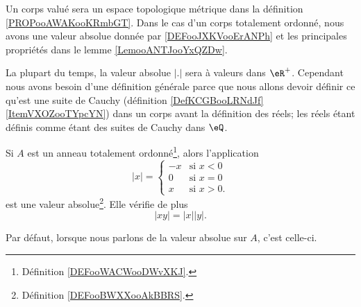 \begin{normaltext}\label{NORooLienCorpsValueEspaceMetrique}
	Un corps valué sera un espace topologique métrique dans la définition \ref{PROPooAWAKooKRmbGT}. Dans le cas d'un corps totalement ordonné, nous avons une valeur absolue donnée par \ref{DEFooJXKVooErANPh} et les principales propriétés dans le lemme \ref{LemooANTJooYxQZDw}.
\end{normaltext}

\begin{normaltext}\label{NORooValAbsGenerale}
	La plupart du temps, la valeur absolue \( | . |\) sera à valeurs dans \( \eR^+\). Cependant nous avons besoin d'une définition générale parce que nous allons devoir définir ce qu'est une suite de Cauchy (définition \ref{DefKCGBooLRNdJf}\ref{ItemVXOZooTYpcYN}) dans un corps avant la définition des réels; les réels étant définis comme étant des suites de Cauchy dans \( \eQ\).
\end{normaltext}


\begin{propositionDef}	\label{DEFooJXKVooErANPh}
	Si \( A\) est un anneau totalement ordonné\footnote{Définition \ref{DEFooWACWooDWvXKJ}.}, alors l'application
	\begin{equation}      \label{EQooNONAooHLSERO}
		| x |=\begin{cases}
			-x & \text{si }x< 0  \\
			0  & \text{si }x= 0  \\
			x  & \text{si } x>0.
		\end{cases}
	\end{equation}
	est une valeur absolue\footnote{Définition \ref{DEFooBWXXooAkBBRS}.}. Elle vérifie de plus
	\begin{equation}		\label{EQooORNAooBYFeFk}
		| xy |=| x || y |.
	\end{equation}

	Par défaut, lorsque nous parlons de la valeur absolue sur \( A\), c'est celle-ci.
\end{propositionDef}


